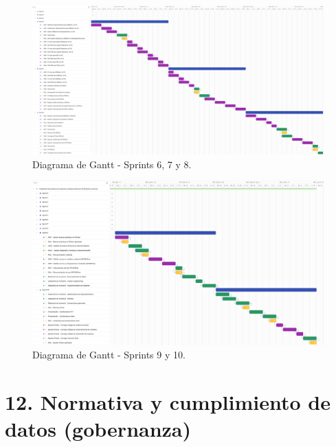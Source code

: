 \documentclass[
11pt, %
]{charter}
\begin{document}
\begin{landscape}
\begin{figure}[htpb]
\centering 
\includegraphics[width=1.5\textwidth]{./Figuras/Gantt-3.png}
\caption{Diagrama de Gantt - Sprints 6, 7 y 8.}
\label{fig:gantt3}
\end{figure}
\end{landscape}

\begin{landscape}
\begin{figure}[htpb]
\centering 
\includegraphics[width=1.5\textwidth]{./Figuras/Gantt-4.png}
\caption{Diagrama de Gantt - Sprints 9 y 10.}
\label{fig:gantt4}
\end{figure}
\end{landscape}

\section{12. Normativa y cumplimiento de datos (gobernanza)}

\end{document}
